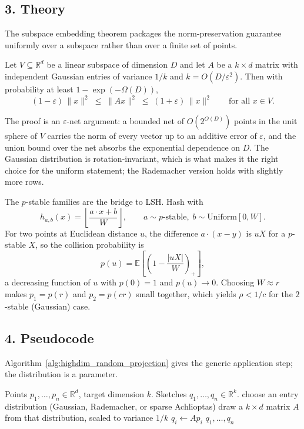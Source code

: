 \subsection{3. Theory}

The subspace embedding theorem packages the norm-preservation guarantee
uniformly over a subspace rather than over a finite set of points.

\begin{theorem}
\label{thm:highdim_subspace_embedding}
Let $V \subseteq \mathbb{R}^d$ be a linear subspace of dimension $D$ and let
$A$ be a $k \times d$ matrix with independent Gaussian entries of variance
$1/k$ and $k = O(D / \varepsilon^2)$. Then with probability at least
$1 - \exp(-\Omega(D))$,
\[
(1 - \varepsilon)\, \|x\|^2 \;\le\; \|A x\|^2 \;\le\; (1 + \varepsilon)\, \|x\|^2
\qquad \text{for all } x \in V.
\]
\end{theorem}

The proof is an $\varepsilon$-net argument: a bounded net of
$O(2^{O(D)})$ points in the unit sphere of $V$ carries the norm of every
vector up to an additive error of $\varepsilon$, and the union bound over the
net absorbs the exponential dependence on $D$. The Gaussian distribution is
rotation-invariant, which is what makes it the right choice for the uniform
statement; the Rademacher version holds with slightly more rows.

The $p$-stable families are the bridge to LSH. Hash with
\[
h_{a,b}(x) = \left\lfloor \frac{a \cdot x + b}{W} \right\rfloor,
\qquad a \sim p\text{-stable},\; b \sim \mathrm{Uniform}[0, W].
\]
For two points at Euclidean distance $u$, the difference $a \cdot (x - y)$ is
$u X$ for a $p$-stable $X$, so the collision probability is
\[
p(u) = \mathbb{E}\left[ \left(1 - \frac{|u X|}{W}\right)_+ \right],
\]
a decreasing function of $u$ with $p(0) = 1$ and $p(u) \to 0$. Choosing
$W \approx r$ makes $p_1 = p(r)$ and $p_2 = p(c r)$ small together, which
yields $\rho < 1/c$ for the $2$-stable (Gaussian) case.

\subsection{4. Pseudocode}

Algorithm~\ref{alg:highdim_random_projection} gives the generic application
step; the distribution is a parameter.

\begin{algorithm}[htbp]
\caption{Random Projection}
\label{alg:highdim_random_projection}
\begin{algorithmic}[1]
\Require Points $p_1, \dots, p_n \in \mathbb{R}^d$, target dimension $k$.
\Ensure Sketches $q_1, \dots, q_n \in \mathbb{R}^k$.
  \State choose an entry distribution (Gaussian, Rademacher, or sparse Achlioptas)
  \State draw a $k \times d$ matrix $A$ from that distribution, scaled to variance $1/k$
    \State $q_i \gets A p_i$
  \EndFor
  \State \Return $q_1, \dots, q_n$
\EndFunction
\end{algorithmic}
\end{algorithm}

